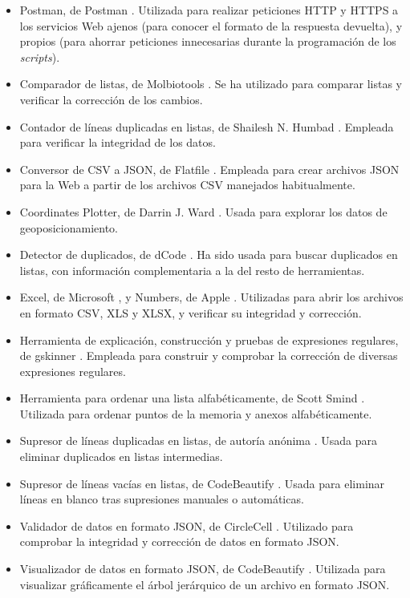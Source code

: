 \begin{itemize}
    \item Postman, de Postman \cite{postman}. Utilizada para realizar peticiones HTTP y HTTPS a los servicios Web ajenos (para conocer el formato de la respuesta devuelta), y propios (para ahorrar peticiones innecesarias durante la programación de los \textit{scripts}).
    \item Comparador de listas, de Molbiotools \cite{molbiotools}. Se ha utilizado para comparar listas y verificar la corrección de los cambios.
    \item Contador de líneas duplicadas en listas, de Shailesh N. Humbad \cite{somacon}. Empleada para verificar la integridad de los datos.
    \item Conversor de CSV a JSON, de Flatfile \cite{csv2json}. Empleada para crear archivos JSON para la Web a partir de los archivos CSV manejados habitualmente.
    \item Coordinates Plotter, de Darrin J. Ward \cite{mapmaker}. Usada para explorar los datos de geoposicionamiento.
    \item Detector de duplicados, de dCode \cite{dcode}. Ha sido usada para buscar duplicados en listas, con información complementaria a la del resto de herramientas.
    \item Excel, de Microsoft \cite{excel}, y Numbers, de Apple \cite{numbers}. Utilizadas para abrir los archivos en formato CSV, XLS y XLSX, y verificar su integridad y corrección.
    \item Herramienta de explicación, construcción y pruebas de expresiones regulares, de gskinner \cite{regexr}. Empleada para construir y comprobar la corrección de diversas expresiones regulares.

    
    \item Herramienta para ordenar una lista alfabéticamente, de Scott Smind \cite{alfabetico}. Utilizada para ordenar puntos de la memoria y anexos alfabéticamente.
    \item Supresor de líneas duplicadas en listas, de autoría anónima \cite{dedupelist}. Usada para eliminar duplicados en listas intermedias.
    \item Supresor de líneas vacías en listas, de CodeBeautify \cite{codebeautify}. Usada para eliminar líneas en blanco tras supresiones manuales o automáticas.
    \item Validador de datos en formato JSON, de CircleCell \cite{jsonlint}. Utilizado para comprobar la integridad y corrección de datos en formato JSON.
    \item Visualizador de datos en formato JSON, de CodeBeautify \cite{jsonviewer}. Utilizada para visualizar gráficamente el árbol jerárquico de un archivo en formato JSON.
\end{itemize}

